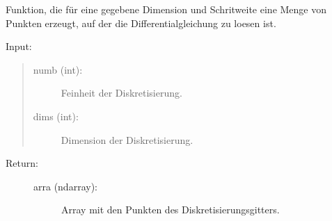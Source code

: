 \documentclass[letterpaper,10pt,ngerman, oneside, openright]{sphinxmanual}
\begin{document}

\begin{fulllineitems}
\label{\detokenize{index:aufg_5_2.gitter}}
Funktion, die für eine gegebene Dimension und Schritweite eine Menge von Punkten erzeugt, auf
der die Differentialgleichung zu loesen ist.
\begin{description}
\item [{Input:}]
\end{description}
\begin{quote}
\begin{description}
\item[{numb (int):}] \leavevmode
Feinheit der Diskretisierung.

\item[{dims (int):}] \leavevmode
Dimension der Diskretisierung.

\end{description}
\end{quote}
\begin{description}
\item[{Return:}] \leavevmode\begin{description}
\item[{arra (ndarray):}] \leavevmode
Array mit den Punkten des Diskretisierungsgitters.

\end{description}

\end{description}

\end{fulllineitems}

\end{document}
